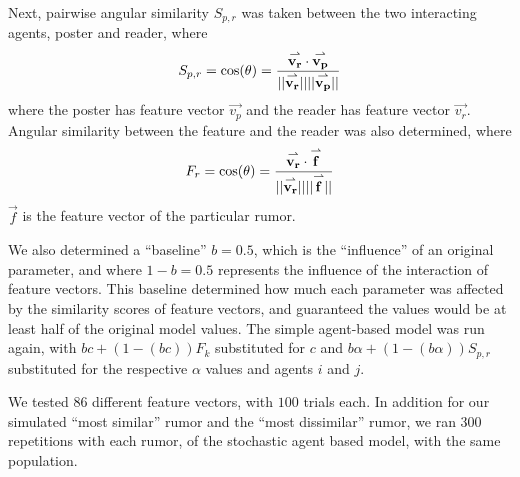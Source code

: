 Next, pairwise angular similarity $ S_{p,r} $ was taken between the two interacting agents, poster and reader, where
$$ S_{p,r} = \cos(\theta) = \frac{\overset{\rightharpoonup}{\mathbf{v_r}}\cdot\overset{\rightharpoonup}{\mathbf{v_p}}}{\lvert\lvert \overset{\rightharpoonup}{\mathbf{v_r}} \rvert\rvert \lvert\lvert \overset{\rightharpoonup}{\mathbf{v_p}} \rvert\rvert} $$ where the poster has feature vector $ \vec{v_p} $ and the reader has feature vector $ \vec{v_r} $.
Angular similarity between the feature and the reader was also determined, where $$ F_r = \cos(\theta) = \frac{\overset{\rightharpoonup}{\mathbf{v_r}}\cdot\overset{\rightharpoonup}{\mathbf{f}}}{\lvert\lvert \overset{\rightharpoonup}{\mathbf{v_r}} \rvert\rvert \lvert\lvert \overset{\rightharpoonup}{\mathbf{f}} \rvert\rvert} $$ $ \vec{f} $ is the feature vector of the particular rumor.

We also determined a ``baseline'' $ b = 0.5 $, which is the ``influence'' of an original parameter, and where $ 1 - b = 0.5 $ represents the influence of the interaction of feature vectors.
This baseline determined how much each parameter was affected by the similarity scores of feature vectors, and guaranteed the values would be at least half of the original model values.
The simple agent-based model was run again, with $ bc + (1-(bc))F_k $ substituted for $ c $ and $ b\alpha + (1-(b\alpha))S_{p,r} $ substituted for the respective $ \alpha $ values and agents $ i $ and $ j $.

We tested $ 86 $ different feature vectors, with $ 100 $ trials each.
In addition for our simulated ``most similar'' rumor and the ``most dissimilar'' rumor, we ran $ 300 $ repetitions with each rumor, of the stochastic agent based model, with the same population.
